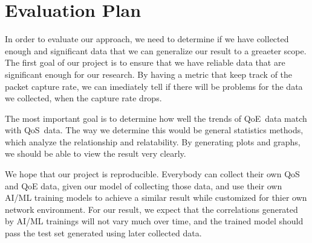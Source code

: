 \section{Evaluation Plan}\label{evaluation}
    In order to evaluate our approach, we need to determine if we have collected enough and significant data that we can generalize our result to a greaeter scope. The first goal of our project is to ensure that we have reliable data that are significant enough for our research. By having a metric that keep track of the packet capture rate, we can imediately tell if there will be problems for the data we collected, when the capture rate drops.

    The most important goal is to determine how well the trends of QoE~data match with QoS~data. The way we determine this would be general statistics methods, which analyze the relationship and relatability. By generating plots and graphs, we should be able to view the result very clearly. 

    We hope that our project is reproducible. Everybody can collect their own QoS and QoE data, given our model of collecting those data, and use their own AI/ML training models to achieve a similar result while customized for thier own network environment. For our result, we expect that the correlations generated by AI/ML trainings will not vary much over time, and the trained model should pass the test set generated using later collected data. 
